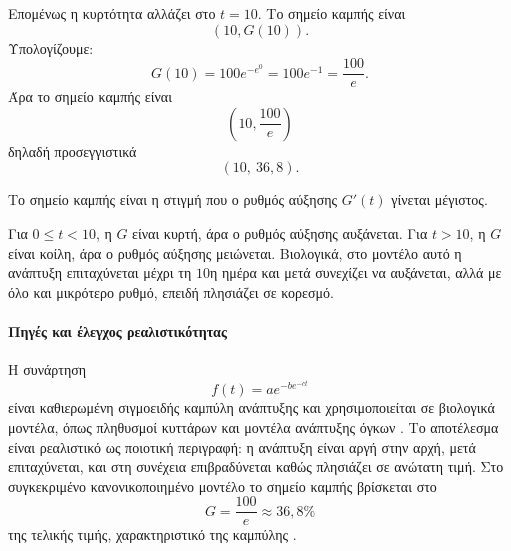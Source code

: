 \begin{alist}
        Επομένως η κυρτότητα αλλάζει στο \(t=10\). Το σημείο καμπής
        είναι
        \[
          \left(10,G(10)\right).
        \]
        Υπολογίζουμε:
        \[
          G(10)=100e^{-e^0}=100e^{-1}=\frac{100}{e}.
        \]
        Άρα το σημείο καμπής είναι
        \[
          {
          \left(10,\frac{100}{e}\right)
          }
        \]
        δηλαδή προσεγγιστικά
        \[
          {(10,\ 36{,}8)}.
        \]

  \item Το σημείο καμπής είναι η στιγμή που ο ρυθμός αύξησης \(G'(t)\)
        γίνεται μέγιστος.

        Για \(0\leq t<10\), η \(G\) είναι κυρτή, άρα ο ρυθμός αύξησης
        αυξάνεται. Για \(t>10\), η \(G\) είναι κοίλη, άρα ο ρυθμός
        αύξησης μειώνεται. Βιολογικά, στο μοντέλο αυτό η ανάπτυξη
        επιταχύνεται μέχρι τη \(10\)η ημέρα και μετά συνεχίζει να
        αυξάνεται, αλλά με όλο και μικρότερο ρυθμό, επειδή πλησιάζει
        σε κορεσμό.
\end{alist}

\paragraph{Πηγές και έλεγχος ρεαλιστικότητας}
Η συνάρτηση 
\[
  f(t)=ae^{-be^{-ct}}
\]
είναι καθιερωμένη σιγμοειδής καμπύλη ανάπτυξης και χρησιμοποιείται σε
βιολογικά μοντέλα, όπως πληθυσμοί κυττάρων και μοντέλα ανάπτυξης όγκων
\cite{gompertzFunctionGrowth}. Το αποτέλεσμα είναι ρεαλιστικό ως
ποιοτική περιγραφή: η ανάπτυξη είναι αργή στην αρχή, μετά επιταχύνεται,
και στη συνέχεια επιβραδύνεται καθώς πλησιάζει σε ανώτατη τιμή. Στο
συγκεκριμένο κανονικοποιημένο μοντέλο το σημείο καμπής βρίσκεται στο
\[
  G=\frac{100}{e}\approx36{,}8\%
\]
της τελικής τιμής, χαρακτηριστικό της καμπύλης .
